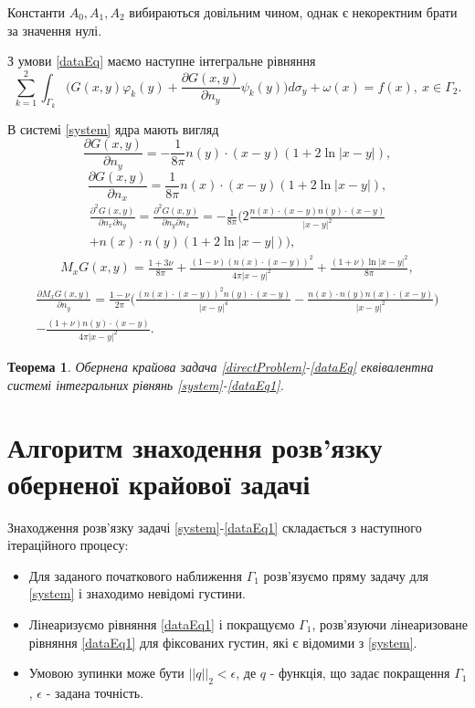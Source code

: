 \documentclass[12pt]{report}
\newtheorem{theorem}{Теорема}
\begin{document}
 Константи $A_0, A_1, A_2$ вибираються довільним чином, однак є некоректним брати за значення нулі.
 
 З умови \eqref{dataEq} маємо наступне інтегральне рівняння
 \begin{equation}
 \label{dataEq1}
	\sum_{k=1}^{2}\int_{\Gamma_k}\bigg(G(x,y)\varphi_k(y)+\frac{\partial G(x,y)}{\partial n_y}\psi_k(y)\bigg)d\sigma_y+\omega(x)=f(x), \ x\in\Gamma_2.
 \end{equation}
 

В системі \eqref{system} ядра мають вигляд
 \begin{equation*}
 	\frac{\partial G(x,y)}{\partial n_y}=-\frac{1}{8\pi}n(y)\cdot(x-y)(1+2\ln|x-y|),
 \end{equation*}
\begin{equation*}
 	\frac{\partial G(x,y)}{\partial n_x}=\frac{1}{8\pi}n(x)\cdot(x-y)(1+2\ln|x-y|),
 \end{equation*}
 \begin{gather*}
 	\frac{\partial^2 G(x,y)}{\partial n_x\partial n_y}=\frac{\partial^2 G(x,y)}{\partial n_y\partial n_x}=-\frac{1}{8\pi}\bigg(2\frac{n(x)\cdot(x-y)n(y)\cdot(x-y)}{|x-y|^2} \\
	+n(x)\cdot n(y)(1+2\ln|x-y|)\bigg),
 \end{gather*}
 \begin{gather*}
 	M_x G(x,y)=\frac{1+3\nu}{8\pi}+\frac{(1-\nu)(n(x)\cdot(x-y))^2}{4\pi|x-y|^2}+\frac{(1+\nu)\ln|x-y|^2}{8\pi},
 \end{gather*}
 \begin{gather*}
 	\frac{\partial M_x G(x,y)}{\partial n_y}=\frac{1-\nu}{2\pi}\Big(\frac{(n(x)\cdot(x-y))^2n(y)\cdot(x-y)}{|x-y|^4}-\frac{n(x)\cdot n(y)n(x)\cdot(x-y)}{|x-y|^2} \Big) \\
	-\frac{(1+\nu)n(y)\cdot(x-y)}{4\pi|x-y|^2}.
 \end{gather*}

\begin{theorem}
Обернена крайова задача \eqref{directProblem}-\eqref{dataEq} еквівалентна системі інтегральних рівнянь \eqref{system}-\eqref{dataEq1}.
\end{theorem}

\section{Алгоритм знаходення розв'язку оберненої крайової задачі}

Знаходження розв'язку задачі \eqref{system}-\eqref{dataEq1} складається з наступного ітераційного процесу:
\begin{itemize}
  \item Для заданого початкового наближення $\Gamma_1$ розв'язуємо пряму задачу для \eqref{system} і знаходимо невідомі густини.
  \item Лінеаризуємо рівняння \eqref{dataEq1} і покращуємо $\Gamma_1$, розв'язуючи лінеаризоване рівняння \eqref{dataEq1} для фіксованих густин, які є відомими з \eqref{system}.
  \item Умовою зупинки може бути $||q||_2  <\epsilon$, де $q$ - функція, що задає покращення  $\Gamma_1$, $\epsilon$ - задана точність.
\end{itemize}
\end{document}
